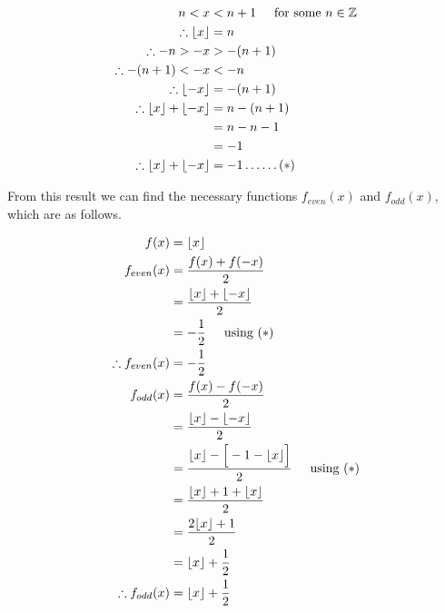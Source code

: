 \documentclass[a4paper]{article}
\begin{document}
\begin{enumerate}[label=\textbf{\arabic*.}]
\begin{enumerate}
		\begin{align*}
		n < x & < n+1 \hspace{5mm} \text{for some $\displaystyle{n \in \mathbb{Z}}$}\\
		\therefore \lfloor{x}\rfloor & = n\\
		\therefore -n > -x & > -(n+1)\\
		\therefore -(n+1) < -x & < -n\\
		\therefore \lfloor{-x}\rfloor & = -(n+1)\\
		\therefore \lfloor{x}\rfloor + \lfloor{-x}\rfloor & = n - (n+1)\\
		& = n - n - 1\\
		& = -1\\
		\therefore \lfloor{x}\rfloor + \lfloor{-x}\rfloor & = -1 \dots\dots(*)\\
		\end{align*}

		From this result we can find the necessary functions $\displaystyle{f_{even}(x)}$ and $\displaystyle{f_{odd}(x)}$, which are as follows.

		\begin{align*}
		f(x) & = \lfloor{x}\rfloor\\
		f_{even}(x) & = \frac{f(x) + f(-x)}{2}\\
		& = \frac{\lfloor{x}\rfloor + \lfloor{-x}\rfloor}{2}\\
		& = -\frac{1}{2} \hspace{5mm} \text{using $\displaystyle{(*)}$}\\
		\therefore f_{even}(x) & = -\frac{1}{2}\\
		f_{odd}(x) & = \frac{f(x) - f(-x)}{2}\\
		& = \frac{\lfloor{x}\rfloor - \lfloor{-x}\rfloor}{2}\\
		& = \frac{\lfloor{x}\rfloor - \Big[ -1 -\lfloor{x}\rfloor \Big]}{2} \hspace{5mm} \text{using $\displaystyle{(*)}$}\\
		& = \frac{\lfloor{x}\rfloor  + 1 + \lfloor{x}\rfloor}{2}\\
		& = \frac{2\lfloor{x}\rfloor  + 1}{2}\\
		& = \lfloor{x}\rfloor + \frac{1}{2}\\
		\therefore f_{odd}(x) & = \lfloor{x}\rfloor + \frac{1}{2}\\
		\end{align*}

	\end{enumerate}


\end{enumerate}
\end{document}
